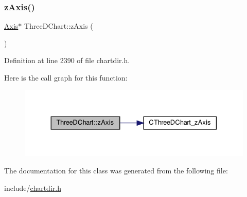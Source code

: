 \subsubsection{\texorpdfstring{z\+Axis()}{zAxis()}}
{\footnotesize\ttfamily \hyperlink{class_axis}{Axis}$\ast$ Three\+D\+Chart\+::z\+Axis (\begin{DoxyParamCaption}{ }\end{DoxyParamCaption})\hspace{0.3cm}{\ttfamily [inline]}}



Definition at line 2390 of file chartdir.\+h.

Here is the call graph for this function\+:
\nopagebreak
\begin{figure}[H]
\begin{center}
\leavevmode
\includegraphics[width=330pt]{class_three_d_chart_a94da9716d472e2221f6f17a4ed30fa00_cgraph}
\end{center}
\end{figure}


The documentation for this class was generated from the following file\+:\begin{DoxyCompactItemize}
\item 
include/\hyperlink{chartdir_8h}{chartdir.\+h}\end{DoxyCompactItemize}
